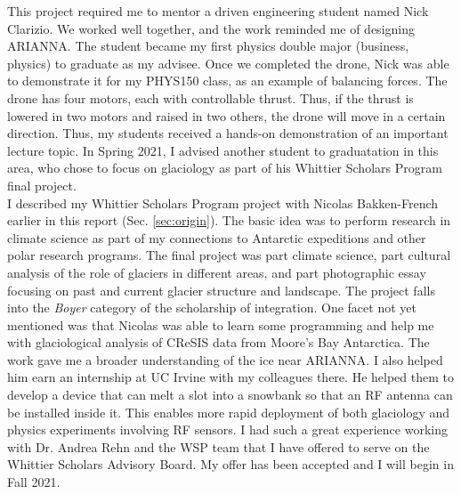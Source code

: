 \documentclass[../../../main.tex]{subfiles}
\begin{document}
This project required me to mentor a driven engineering student named Nick Clarizio.  We worked well together, and the work reminded me of designing ARIANNA.  The student became my first physics double major (business, physics) to graduate as my advisee.  Once we completed the drone, Nick was able to demonstrate it for my PHYS150 class, as an example of balancing forces.  The drone has four motors, each with controllable thrust.  Thus, if the thrust is lowered in two motors and raised in two others, the drone will move in a certain direction.  Thus, my students received a hands-on demonstration of an important lecture topic.  In Spring 2021, I advised another student to graduatation in this area, who chose to focus on glaciology as part of his Whittier Scholars Program final project.
\\
\vspace{0.15cm}
I described my Whittier Scholars Program project with Nicolas Bakken-French earlier in this report (Sec. \ref{sec:origin}).  The basic idea was to perform research in climate science as part of my connections to Antarctic expeditions and other polar research programs.  The final project was part climate science, part cultural analysis of the role of glaciers in different areas, and part photographic essay focusing on past and current glacier structure and landscape.  The project falls into the \textit{Boyer} category of the scholarship of integration.  One facet not yet mentioned was that Nicolas was able to learn some programming and help me with glaciological analysis of CReSIS data from Moore's Bay Antarctica.  The work gave me a broader understanding of the ice near ARIANNA.  I also helped him earn an internship at UC Irvine with my colleagues there.  He helped them to develop a device that can melt a slot into a snowbank so that an RF antenna can be installed inside it.  This enables more rapid deployment of both glaciology and physics experiments involving RF sensors.  I had such a great experience working with Dr. Andrea Rehn and the WSP team that I have offered to serve on the Whittier Scholars Advisory Board.  My offer has been accepted and I will begin in Fall 2021.
\end{document}
